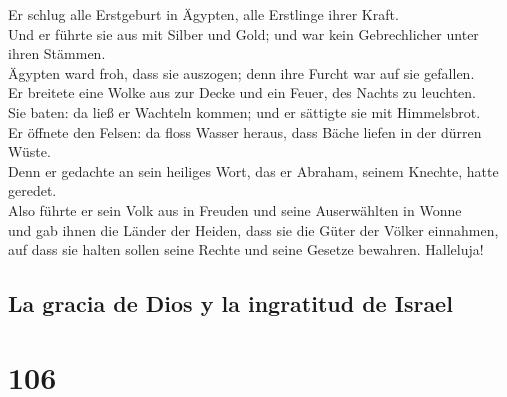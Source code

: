  Er schlug alle Erstgeburt in Ägypten, alle Erstlinge
ihrer Kraft.\\
 Und er führte sie aus mit Silber und Gold; und war kein
Gebrechlicher unter ihren Stämmen.\\
 Ägypten ward froh, dass sie auszogen; denn ihre Furcht
war auf sie gefallen.\\
 Er breitete eine Wolke aus zur Decke und ein Feuer, des
Nachts zu leuchten.\\
 Sie baten: da ließ er Wachteln kommen; und er sättigte
sie mit Himmelsbrot.\\
 Er öffnete den Felsen: da floss Wasser heraus, dass
Bäche liefen in der dürren Wüste.\\
 Denn er gedachte an sein heiliges Wort, das er Abraham,
seinem Knechte, hatte geredet.\\
 Also führte er sein Volk aus in Freuden und seine
Auserwählten in Wonne\\
 und gab ihnen die Länder der Heiden, dass sie die Güter
der Völker einnahmen,\\
 auf dass sie halten sollen seine Rechte und seine
Gesetze bewahren. Halleluja!

\hypertarget{la-gracia-de-dios-y-la-ingratitud-de-israel}{%
\subsection{La gracia de Dios y la ingratitud de
Israel}\label{la-gracia-de-dios-y-la-ingratitud-de-israel}}

\hypertarget{section-105}{%
\section{106}\label{section-105}}

